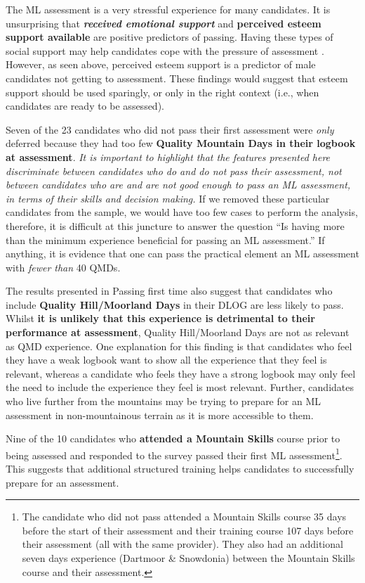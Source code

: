 \documentclass[a4paper,]{book}
\begin{document}
The ML assessment is a very stressful experience for many candidates. It is unsurprising that \emph{\textbf{received emotional support}} and \textbf{perceived esteem support available} are positive predictors of passing. Having these types of social support may help candidates cope with the pressure of assessment \citep{Freeman2014, Freeman2011}. However, as seen above, perceived esteem support is a predictor of male candidates not getting to assessment. These findings would suggest that esteem support should be used sparingly, or only in the right context (i.e., when candidates are ready to be assessed).

Seven of the 23 candidates who did not pass their first assessment were \emph{only} deferred because they had too few \textbf{Quality Mountain Days in their logbook at assessment}. \emph{It is important to highlight that the features presented here discriminate between candidates who do and do not pass their assessment, not between candidates who are and are not good enough to pass an ML assessment, in terms of their skills and decision making.} If we removed these particular candidates from the sample, we would have too few cases to perform the analysis, therefore, it is difficult at this juncture to answer the question ``Is having more than the minimum experience beneficial for passing an ML assessment.'' If anything, it is evidence that one can pass the practical element an ML assessment with \emph{fewer than} 40 QMDs.

The results presented in \protect\hypertarget{passing}{}{Passing first time} also suggest that candidates who include \textbf{Quality Hill/Moorland Days} in their DLOG are less likely to pass. Whilst \textbf{it is unlikely that this experience is detrimental to their performance at assessment}, Quality Hill/Moorland Days are not as relevant as QMD experience. One explanation for this finding is that candidates who feel they have a weak logbook want to show all the experience that they feel is relevant, whereas a candidate who feels they have a strong logbook may only feel the need to include the experience they feel is most relevant. Further, candidates who live further from the mountains may be trying to prepare for an ML assessment in non-mountainous terrain as it is more accessible to them.

Nine of the 10 candidates who \textbf{attended a Mountain Skills} course prior to being assessed and responded to the survey passed their first ML assessment\footnote{The candidate who did not pass attended a Mountain Skills course 35 days before the start of their assessment and their training course 107 days before their assessment (all with the same provider). They also had an additional seven days experience (Dartmoor \& Snowdonia) between the Mountain Skills course and their assessment.}. This suggests that additional structured training helps candidates to successfully prepare for an assessment.
\end{document}
